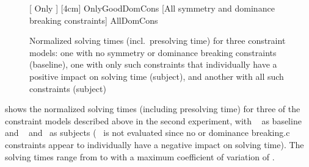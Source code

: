 
\begin{figure}
  \centering%

                      [%
                        Only
                      ]%
                      [4cm]%
                      {OnlyGoodDomCons}%
  \hfill%
                      [All symmetry and dominance breaking constraints]%
                      {AllDomCons}%

  \caption[%
            Plot for evaluating the impact on solving time made by different
            combinations of symmetry and dominance breaking constraints%
          ]%
          {%
            Normalized solving times (incl.\ presolving time) for three
            constraint models: one with no symmetry or dominance breaking
            constraints (baseline), one with only such constraints that
            individually have a positive impact on solving time (subject), and
            another with all such constraints (subject)%
          }
\end{figure}

 shows the normalized solving
times (including \gls{presolving} time) for three of the \glspl{constraint
  model} described above in the second experiment, with ~\modelC{} as \gls{baseline} and ~\modelD{}
and~\modelF{} as \glspl{subject} (~\modelE{} is not
evaluated since no  or \gls{dominance breaking.c}
\glspl{constraint} appear to individually have a negative impact on solving
time).
%
The solving times range from
\printMinSolvingTime{
  \SolvTechEnableOnlyGoodDomConsPrePlusSolvingTimeSpeedupNonePrePlusSolvingTimeAvgMin,
  \SolvTechEnableOnlyGoodDomConsPrePlusSolvingTimeSpeedupPrePlusSolvingTimeAvgMin,
  \SolvTechDisableAllDomConsPrePlusSolvingTimeSpeedupPrePlusSolvingTimeAvgMin
} to
\printMaxSolvingTime{
  \SolvTechEnableOnlyGoodDomConsPrePlusSolvingTimeSpeedupNonePrePlusSolvingTimeAvgMax,
  \SolvTechEnableOnlyGoodDomConsPrePlusSolvingTimeSpeedupPrePlusSolvingTimeAvgMax,
  \SolvTechDisableAllDomConsPrePlusSolvingTimeSpeedupPrePlusSolvingTimeAvgMax
} with a maximum coefficient of variation of
\numMaxOf{
  \SolvTechEnableOnlyGoodDomConsPrePlusSolvingTimeSpeedupNonePrePlusSolvingTimeCvMax,
  \SolvTechEnableOnlyGoodDomConsPrePlusSolvingTimeSpeedupPrePlusSolvingTimeCvMax,
  \SolvTechDisableAllDomConsPrePlusSolvingTimeSpeedupPrePlusSolvingTimeCvMax
}.


